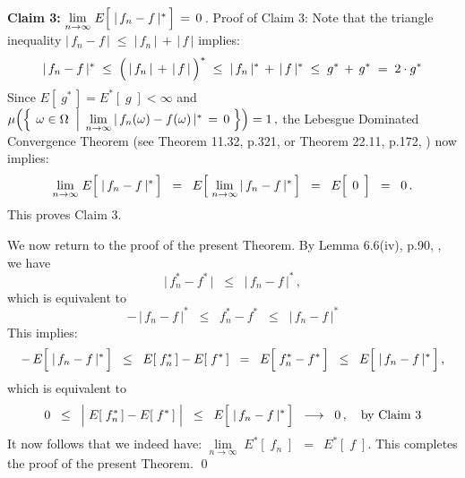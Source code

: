 \vskip 0.5cm
\noindent
\textbf{Claim 3:}\quad
$\underset{n\rightarrow\infty}{\lim}\;E\!\left[\;\vert\,f_{n} \overset{{\color{white}.}}{-} f\,\vert^{*}\,\right] \,=\, 0$\,.
\vskip 0.1cm
\noindent
Proof of Claim 3:\quad
Note that the triangle inequality \;$\vert\,f_{n}-f\,\vert \; \leq \; \vert\,f_{n}\,\vert \,+\, \vert\,f\,\vert$\; implies:
\begin{equation*}
\vert\,f_{n}-f\,\vert^{*}
\; \leq \;
	\left(\,\vert\,f_{n}\,\vert \,\overset{{\color{white}.}}{+}\, \vert\,f\,\vert\,\right)^{*}
\; \leq \;
	\vert\,f_{n}\,\vert^{*} \,\overset{{\color{white}.}}{+}\, \vert\,f\,\vert^{*}
\; \leq \;
	g^{*} \,+\, g^{*}
\; = \;
	2 \cdot g^{*}
\end{equation*}
Since \;$E\!\left[\;g^{*}\,\right] = E^{*}\!\left[\;g\;\right] < \infty$\;
and
\;$\mu\!\left(\left\{\;
	\left.
	\omega \overset{{\color{white}.}}{\in} \Omega
	\;\;\right\vert\;
	\underset{n\rightarrow\infty}{\lim}\,\vert\, f_{n}(\omega) - f(\omega) \,\vert^{*} \,=\, 0
	\;\right\}\right)
= 1\,,$\;
the Lebesgue Dominated Convergence Theorem
(see Theorem 11.32, p.321, \cite{Rudin1976} or Theorem 22.11, p.172, \cite{Aliprantis1998})
now implies:
\begin{equation*}
\underset{n\rightarrow\infty}{\lim}\;E\!\left[\;\vert\,f_{n} \overset{{\color{white}.}}{-} f\,\vert^{*}\,\right]
\;\; = \;\;
	E\!\left[\;\underset{n\rightarrow\infty}{\lim}\,\vert\,f_{n} \overset{{\color{white}.}}{-} f\,\vert^{*}\,\right]
\;\; = \;\;
	E\!\left[\;\, \overset{{\color{white}.}}{0} \,\;\right]
\;\; = \;\;
	0\,.
\end{equation*}
This proves Claim 3.

\vskip 0.8cm
\noindent
We now return to the proof of the present Theorem.
By Lemma 6.6(iv), p.90, \cite{Kosorok2008}, we have
\begin{equation*}
\vert\,f_{n}^{*} - f^{*}\,\vert
\;\; \leq \;\;
	\vert\,f_{n} - f\,\vert^{*}\,,
\end{equation*}
which is equivalent to
\begin{equation*}
-\,\vert\,f_{n} - f\,\vert^{*}
\;\; \leq \;\;
	f_{n}^{*} - f^{*}
\;\; \leq \;\;
	\vert\,f_{n} - f\,\vert^{*}
\end{equation*}
This implies:
\begin{equation*}
-\,E\!\left[\;\vert\,f_{n} \overset{{\color{white}.}}{-} f\,\vert^{*}\,\right]
\;\; \leq \;\;
	E\!\left[\;f_{n}^{*}\,\right] \overset{{\color{white}.}}{-} E\!\left[\;f^{*}\,\right]
\;\; = \;\;
	E\!\left[\;f_{n}^{*} \overset{{\color{white}.}}{-} f^{*}\,\right]
\;\; \leq \;\;
	E\!\left[\;\vert\,f_{n} \overset{{\color{white}.}}{-} f\,\vert^{*}\,\right],
\end{equation*}
which is equivalent to
\begin{equation*}
0
\;\; \leq \;\;
	\left\vert\;
		E\!\left[\;f_{n}^{*}\,\right] \overset{{\color{white}.}}{-} E\!\left[\;f^{*}\,\right]
	\;\right\vert
\;\; \leq \;\;
	E\!\left[\;\vert\,f_{n} \overset{{\color{white}.}}{-} f\,\vert^{*}\,\right]
\;\; \longrightarrow \;\;
	0\,,
	\quad
	\textnormal{by Claim 3}
\end{equation*}
It now follows that we indeed have:
\;$\underset{n\rightarrow\infty}{\lim}\;E^{*}\!\left[\;f_{n}\;\right]$ \,$=$\, $E^{*}\!\left[\;f\;\right]$.\;
This completes the proof of the present Theorem.
\qed

